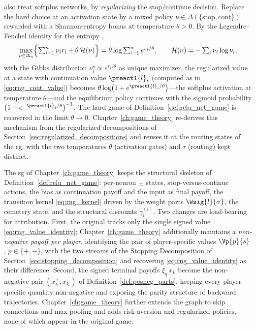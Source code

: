 \begin{remark}\label{rem:softplus_game}
\textcite{Gaubert2025} also treat softplus networks, by \emph{regularizing} the stop/continue decision. Replace the hard choice at an activation state by a mixed policy $\nu \in \Delta(\{\mathrm{stop}, \mathrm{cont}\})$ rewarded with a Shannon-entropy bonus at temperature $\theta > 0$. By the Legendre--Fenchel identity for the entropy \parencite{BoydVandenberghe2004},
\begin{equation}
	\max_{\nu \in \Delta_n} \Bigl\{ \textstyle\sum_{i=1}^{n} \nu_i r_i + \theta\, \mathcal{H}(\nu) \Bigr\}
	= \theta \log \textstyle\sum_{i=1}^{n} e^{r_i / \theta},
	\qquad
	\mathcal{H}(\nu) = -\textstyle\sum_i \nu_i \log \nu_i,
	\label{eq:legendre_fenchel}
\end{equation}
with the Gibbs distribution $\nu^{\star}_i \propto e^{r_i/\theta}$ as unique maximizer, the regularized value at a state with continuation value $\preactl{l}_i$ (computed as in \eqref{eq:rng_cont_value}) becomes $\theta \log\bigl(1 + e^{\preactl{l}_i / \theta}\bigr)$---the softplus activation at temperature $\theta$---and the equilibrium policy continues with the sigmoid probability $\bigl(1 + e^{-\preactl{l}_i/\theta}\bigr)^{-1}$. The hard game of Definition~\ref{def:relu_net_game} is recovered in the limit $\theta \to 0$. Chapter~\ref{ch:game_theory} re-derives this mechanism from the regularized decompositions of Section~\ref{sec:regularized_decompositions} and reuses it at the routing states of the \ac{rg}, with the two temperatures $\theta$ (activation gates) and $\tau$ (routing) kept distinct.
\end{remark}

\begin{remark}\label{rem:inherited_vs_new}
The \ac{sg} of Chapter~\ref{ch:game_theory} keeps the structural skeleton of Definition~\ref{def:relu_net_game}: per-neuron $\pm$ states, stop-versus-continue actions, the bias as continuation payoff and the input as final payoff, the transition kernel \eqref{eq:rng_kernel} driven by the weight parts $\Wsig{l}{\sigma}$, the cemetery state, and the structural discounts $\gamma^{(l)}_i$. Two changes are load-bearing for attribution. First, the original tracks only the single signed value \eqref{eq:rng_value_identity}; Chapter~\ref{ch:game_theory} additionally maintains a \emph{non-negative payoff per player}, identifying the pair of player-specific values $\Vp{p}{s}$, $p \in \{+,-\}$, with the two streams of the Stopping Decomposition of Section~\ref{sec:stopping_decomposition} and recovering \eqref{eq:rng_value_identity} as their difference. Second, the signed terminal payoffs $\xi_q\, x_k$ become the non-negative pair $(x_k^{+}, x_k^{-})$ of Definition~\ref{def:posneg_parts}, keeping every player-specific quantity non-negative and exposing the parity structure of backward trajectories. Chapter~\ref{ch:game_theory} further extends the graph to skip connections and max-pooling and adds risk aversion and regularized policies, none of which appear in the original game.
\end{remark}

